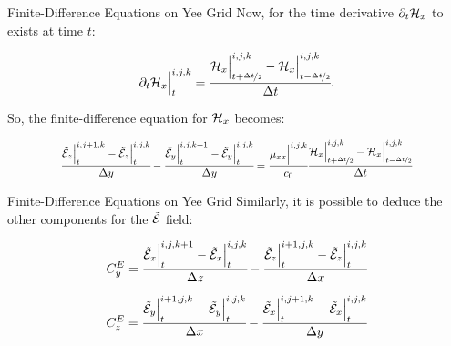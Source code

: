\documentclass[aspectratio=169]{beamer}
\begin{document}
\begin{frame}{Finite-Difference Equations on Yee Grid}
  Now, for the time derivative $\partial_t \mathcal{H}_x$ to exists at time $t$:

\begin{equation}
    \partial_t \mathcal{H}_x\Big|^{i,j,k}_t = \cfrac{\mathcal{H}_x\Big|^{i,j,k}_{t+\nicefrac{\Delta t}{2}} - \mathcal{H}_x\Big|^{i,j,k}_{t-\nicefrac{\Delta t}{2}}}{\Delta t}.
\end{equation}

So, the finite-difference equation for $\mathcal{H}_x$ becomes:

\begin{align}
  \resizebox{.8\hsize}{!}{$
    \cfrac{\En_z\Big|^{i,j+1,k}_{t}-\En_z\Big|^{i,j,k}_{t}}{\dy} - \cfrac{\En_y\Big|^{i,j,k+1}_{t}-\En_y\Big|^{i,j,k}_{t}}{\dy}
    =\cfrac{\mu_{xx}\Big|^{i,j,k}}{c_0}\cfrac{\Hht_x\Big|^{i,j,k}_{t+\nicefrac{\dt}{2}} - \Hht_x\Big|^{i,j,k}_{t-\nicefrac{\dt}{2}}}{\dt}
    \label{eq:fd_hx}
  $}
\end{align}

\end{frame}

\begin{frame}{Finite-Difference Equations on Yee Grid}
  Similarly, it is possible to deduce the other components for the $\tilde{\mathcal{E}}$ field:

      \begin{align}
        C_y^E = \cfrac{\tilde{\mathcal{E}}_x\Big|^{i,j,k+1}_{t}-\tilde{\mathcal{E}}_x\Big|^{i,j,k}_{t}}{\Delta z} - \cfrac{\tilde{\mathcal{E}}_z\Big|^{i+1,j,k}_{t}-\tilde{\mathcal{E}}_z\Big|^{i,j,k}_{t}}{\Delta x}
        \label{eq:CEy}
      \end{align}
    
      \begin{align}
            C_z^E = \cfrac{\tilde{\mathcal{E}}_y\Big|^{i+1,j,k}_{t}-\tilde{\mathcal{E}}_y\Big|^{i,j,k}_{t}}{\Delta x} - \cfrac{\tilde{\mathcal{E}}_x\Big|^{i,j+1,k}_{t}-\tilde{\mathcal{E}}_x\Big|^{i,j,k}_{t}}{\Delta y}
            \label{eq:CEz}
      \end{align}
\end{frame}
\end{document}

